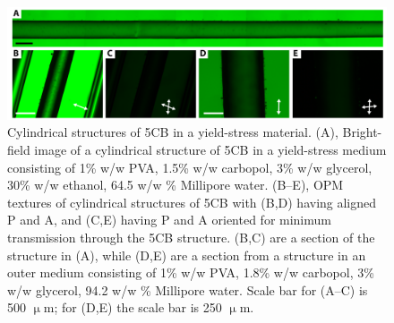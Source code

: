 \begin{figure}
  \centering
  \includegraphics{figures/C7/Ch7-Figs_CapStructures.png}
  \caption{Cylindrical structures of 5CB in a yield-stress material.
  (A), Bright-field image of a cylindrical structure of 5CB in a yield-stress medium consisting of 1\% w/w PVA, 1.5\% w/w carbopol, 3\% w/w glycerol, 30\% w/w ethanol, 64.5 w/w \% Millipore water.
  (B--E), OPM textures of cylindrical structures of 5CB with (B,D) having aligned P and A, and (C,E) having P and A oriented for minimum transmission through the 5CB structure.
  (B,C) are a section of the structure in (A), while (D,E) are a section from a structure in an outer medium consisting of 1\% w/w PVA, 1.8\% w/w carbopol, 3\% w/w glycerol, 94.2 w/w \% Millipore water.
  Scale bar for (A--C) is 500 $\upmu$m; for (D,E) the scale bar is 250 $\upmu$m.
  }\label{f:7-CapStructure}
\end{figure}
